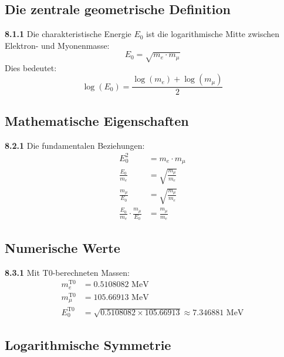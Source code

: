 \documentclass[12pt,a4paper]{article}
\newcommand{\Ezero}{E_0}
\begin{document}
\subsection{Die zentrale geometrische Definition}

\begin{tcolorbox}[colback=yellow!10!white,colframe=red!75!black,title=Fundamentale Definition]
	\noindent \textbf{8.1.1} Die charakteristische Energie $\Ezero$ ist die logarithmische Mitte zwischen Elektron- und Myonenmasse:
	\begin{equation}
		\boxed{\Ezero = \sqrt{m_e \cdot m_\mu}}
		\label{eq:E0_fundamental}
	\end{equation}
	Dies bedeutet:
	\begin{equation}
		\log(\Ezero) = \frac{\log(m_e) + \log(m_\mu)}{2}
		\label{eq:E0_logarithmic}
	\end{equation}
\end{tcolorbox}

\subsection{Mathematische Eigenschaften}

\noindent \textbf{8.2.1} Die fundamentalen Beziehungen:
\begin{align}
	\Ezero^2 &= m_e \cdot m_\mu \label{eq:E0_squared} \\
	\frac{\Ezero}{m_e} &= \sqrt{\frac{m_\mu}{m_e}} \label{eq:E0_ratio1} \\
	\frac{m_\mu}{\Ezero} &= \sqrt{\frac{m_\mu}{m_e}} \label{eq:E0_ratio2} \\
	\frac{\Ezero}{m_e} \cdot \frac{m_\mu}{\Ezero} &= \frac{m_\mu}{m_e} \label{eq:E0_product}
\end{align}

\subsection{Numerische Werte}

\noindent \textbf{8.3.1} Mit T0-berechneten Massen:
\begin{align}
	m_e^{\text{T0}} &= 0.5108082 \text{ MeV} \\
	m_\mu^{\text{T0}} &= 105.66913 \text{ MeV} \\
	\Ezero^{\text{T0}} &= \sqrt{0.5108082 \times 105.66913} \approx 7.346881 \text{ MeV}
\end{align}

\subsection{Logarithmische Symmetrie}
\end{document}
